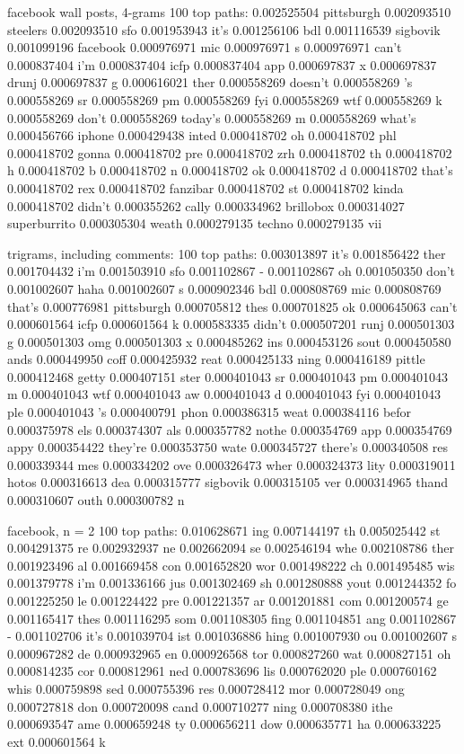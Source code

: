 
facebook wall posts, 4-grams
100 top paths:
0.002525504 pittsburgh
0.002093510 steelers
0.002093510 sfo
0.001953943 it's
0.001256106 bdl
0.001116539 sigbovik
0.001099196 facebook
0.000976971 mic
0.000976971 s
0.000976971 can't
0.000837404 i'm
0.000837404 icfp
0.000837404 app
0.000697837 x
0.000697837 drunj
0.000697837 g
0.000616021 ther
0.000558269 doesn't
0.000558269 's
0.000558269 sr
0.000558269 pm
0.000558269 fyi
0.000558269 wtf
0.000558269 k
0.000558269 don't
0.000558269 today's
0.000558269 m
0.000558269 what's
0.000456766 iphone
0.000429438 inted
0.000418702 oh
0.000418702 phl
0.000418702 gonna
0.000418702 pre
0.000418702 zrh
0.000418702 th
0.000418702 h
0.000418702 b
0.000418702 n
0.000418702 ok
0.000418702 d
0.000418702 that's
0.000418702 rex
0.000418702 fanzibar
0.000418702 st
0.000418702 kinda
0.000418702 didn't
0.000355262 cally
0.000334962 brillobox
0.000314027 superburrito
0.000305304 weath
0.000279135 techno
0.000279135 vii


trigrams, including comments:
100 top paths:
0.003013897 it's
0.001856422 ther
0.001704432 i'm
0.001503910 sfo
0.001102867 -
0.001102867 oh
0.001050350 don't
0.001002607 haha
0.001002607 s
0.000902346 bdl
0.000808769 mic
0.000808769 that's
0.000776981 pittsburgh
0.000705812 thes
0.000701825 ok
0.000645063 can't
0.000601564 icfp
0.000601564 k
0.000583335 didn't
0.000507201 runj
0.000501303 g
0.000501303 omg
0.000501303 x
0.000485262 ins
0.000453126 sout
0.000450580 ands
0.000449950 coff
0.000425932 reat
0.000425133 ning
0.000416189 pittle
0.000412468 getty
0.000407151 ster
0.000401043 sr
0.000401043 pm
0.000401043 m
0.000401043 wtf
0.000401043 aw
0.000401043 d
0.000401043 fyi
0.000401043 ple
0.000401043 's
0.000400791 phon
0.000386315 weat
0.000384116 befor
0.000375978 els
0.000374307 als
0.000357782 nothe
0.000354769 app
0.000354769 appy
0.000354422 they're
0.000353750 wate
0.000345727 there's
0.000340508 res
0.000339344 mes
0.000334202 ove
0.000326473 wher
0.000324373 lity
0.000319011 hotos
0.000316613 dea
0.000315777 sigbovik
0.000315105 ver
0.000314965 thand
0.000310607 outh
0.000300782 n


facebook, n = 2
100 top paths:
0.010628671 ing
0.007144197 th
0.005025442 st
0.004291375 re
0.002932937 ne
0.002662094 se
0.002546194 whe
0.002108786 ther
0.001923496 al
0.001669458 con
0.001652820 wor
0.001498222 ch
0.001495485 wis
0.001379778 i'm
0.001336166 jus
0.001302469 sh
0.001280888 yout
0.001244352 fo
0.001225250 le
0.001224422 pre
0.001221357 ar
0.001201881 com
0.001200574 ge
0.001165417 thes
0.001116295 som
0.001108305 fing
0.001104851 ang
0.001102867 -
0.001102706 it's
0.001039704 ist
0.001036886 hing
0.001007930 ou
0.001002607 s
0.000967282 de
0.000932965 en
0.000926568 tor
0.000827260 wat
0.000827151 oh
0.000814235 cor
0.000812961 ned
0.000783696 lis
0.000762020 ple
0.000760162 whis
0.000759898 sed
0.000755396 res
0.000728412 mor
0.000728049 ong
0.000727818 don
0.000720098 cand
0.000710277 ning
0.000708380 ithe
0.000693547 ame
0.000659248 ty
0.000656211 dow
0.000635771 ha
0.000633225 ext
0.000601564 k


